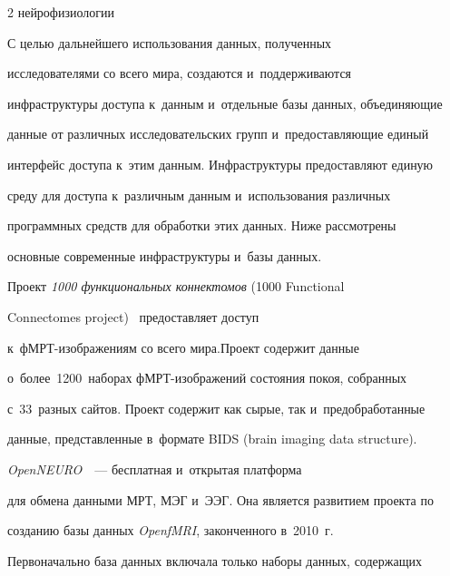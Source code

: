 \begin{multicols}{2}
{нейрофизиологии}





    С целью дальнейшего использования данных, полученных 


исследователями со всего мира, создаются и~поддерживаются 


инфраструктуры доступа к~данным и~отдельные базы данных, объеди\-ня\-ющие 


данные от различных исследовательских групп и~пред\-остав\-ля\-ющие единый 


интерфейс доступа к~этим данным. Инфраструктуры пред\-остав\-ля\-ют единую 


среду для доступа к~различным данным и~использования различных 


программных средств для обработки этих данных. Ниже рассмотрены 


основные современные инфраструктуры и~базы данных.





\medskip


    


    Проект \textit{1000 функциональных коннектомов} (1000 Functional 


Connectomes project)~\cite{8-bs} предоставляет доступ  


к~фМРТ-изоб\-ра\-же\-ни\-ям со всего мира.\linebreak Проект содержит данные 


о~более~1200~наборах фМРТ-изображений состояния покоя, собранных 


с~33~разных сайтов. Проект содержит как сырые, так и~пред\-об\-ра\-бо\-тан\-ные 


данные, представленные в~формате BIDS  (brain imaging data structure).





\medskip


    


    \textit{OpenNEURO}~\cite{9-bs}~--- бесплатная и~открытая платформа 


для обмена данными МРТ, МЭГ и~ЭЭГ. Она является развитием проекта по 


созданию базы данных \textit{OpenfMRI}, законченного в~2010~г. 


Первоначально база данных включала только наборы данных, содержащих 



\end{multicols}
